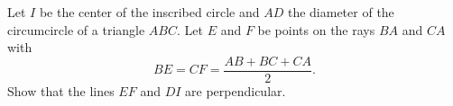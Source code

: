 Let $I$ be the center of the inscribed circle and $AD$ the diameter of the circumcircle
of a triangle $ABC$. Let $E$ and $F$ be points on the rays $BA$ and $CA$ with
$$BE = CF = \frac{AB+BC+CA}{2}.$$
Show that the lines $EF$ and $DI$ are perpendicular.